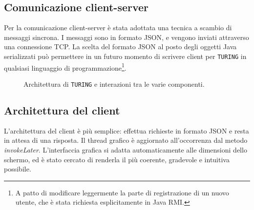 \subsection{Comunicazione client-server}
Per la comunicazione client-server è stata adottata una tecnica a scambio di messaggi sincrona. I messaggi sono in formato JSON, e vengono inviati attraverso una connessione TCP. La scelta del formato JSON al posto degli oggetti Java serializzati può permettere in un futuro momento di scrivere client per \texttt{TURING} in qualsiasi linguaggio di programmazione\footnote{A patto di modificare leggermente la parte di registrazione di un nuovo utente, che è stata richiesta esplicitamente in Java RMI.}.

\newpage

\begin{center}
	\begin{figure}[h!]
		\caption{Architettura di \texttt{TURING} e interazioni tra le varie componenti.}
	\end{figure}
\end{center}

\subsection{Architettura del client}
L'architettura del client è più semplice: effettua richieste in formato JSON e resta in attesa di una risposta. Il thread grafico è aggiornato all'occorrenza dal metodo \textit{invokeLater}. L'interfaccia grafica si adatta automaticamente alle dimensioni dello schermo, ed è stato cercato di renderla il più coerente, gradevole e intuitiva possibile.

